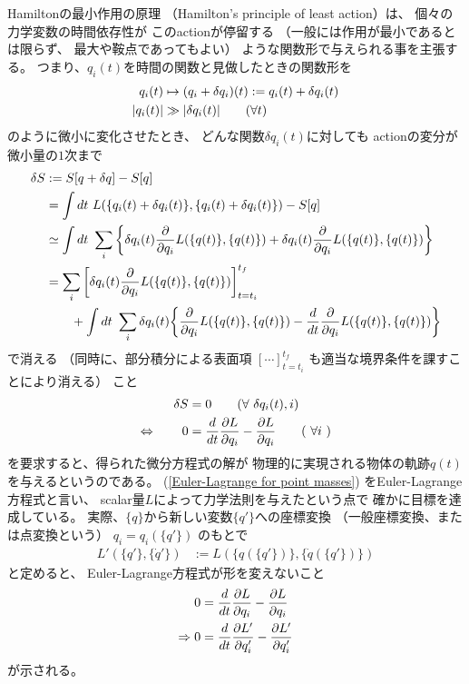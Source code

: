 Hamiltonの最小作用の原理
（Hamilton’s principle of least action）は、
個々の力学変数の時間依存性が
このactionが停留する
（一般には作用が最小であるとは限らず、
最大や鞍点であってもよい）
ような関数形で与えられる事を主張する。
つまり、$q_i(t)$を時間の関数と見做したときの関数形を
\begin{align}
  q_i(t) &\mapsto (q_i+\delta q_i)(t) := q_i(t) + \delta q_i(t)
  \\
  | q_i(t) | & \gg | \delta q_i(t) |
  \qquad (\forall t)
\notag
\end{align}
のように微小に変化させたとき、
どんな関数$\delta q_i(t)$に対しても
actionの変分が微小量の$1$次まで
\begin{align}
  \delta S &:=
  S[q + \delta q] - S[q]
\notag\\&=
  \int dt\ L(\{ q_i(t) + \delta q_i(t) \},
  \{ \dot{q}_i(t) + \delta \dot{q}_i(t) \} )
  - S[q]
\notag\\&\simeq
  \int dt\ \sum_i
  \bigg\{
    \delta q_i(t)
    \dfrac{\partial}{\partial q_i}
    L(\{ q(t) \},
    \{ \dot{q}(t) \} )
+
    \delta \dot{q}_i(t)
    \dfrac{\partial}{\partial \dot{q}_i}
    L(\{ q(t) \},
    \{ \dot{q}(t) \} )
  \bigg\}
\notag\\&=
  \sum_i
  \bigg[
    \delta q_i(t)
    \dfrac{\partial}{\partial \dot{q}_i}
    L(\{ q(t) \},
    \{ \dot{q}(t) \} )
  \bigg]_{t=t_i}^{t_f}
\notag\\&\qquad
  +
\int dt\ \sum_i
\delta q_i(t)
\bigg\{
  \dfrac{\partial}{\partial q_i}
  L(\{ q(t) \},
  \{ \dot{q}(t) \} )
-
  \dfrac{d}{dt}
  \dfrac{\partial}{\partial \dot{q}_i}
  L(\{ q(t) \},
  \{ \dot{q}(t) \} )
\bigg\}
\label{variation of action}
\end{align}
で消える
（同時に、部分積分による表面項
$[\cdots]_{t=t_i}^{t_f}$
も適当な境界条件を課すことにより消える）
こと
\begin{align}
  \delta S &= 0
  \qquad (\forall\ \delta q_i(t), i)
\notag\\\Leftrightarrow\qquad
  0 &=
  \dfrac{d}{dt}\dfrac{\partial L}{\partial \dot{q}_i }
  - \dfrac{\partial L}{\partial q_i }
  \qquad (\ \forall i\ )
\label{Euler-Lagrange for point masses}
\end{align}
を要求すると、得られた微分方程式の解が
物理的に実現される物体の軌跡${q(t)}$
を与えるというのである。
(\ref{Euler-Lagrange for point masses})
をEuler-Lagrange方程式と言い、
scalar量$L$によって力学法則を与えたという点で
確かに目標を達成している。
実際、$\{q\}$から新しい変数$\{ q'\}$への座標変換
（一般座標変換、または点変換という）
$q_i = q_i(\{q'\})$
のもとで
\begin{align}
  L'(\{q'\}, \{\dot{q}'\}) &:= L(\{q(\{q'\})\}, \{\dot{q}(\{q'\})\})
\end{align}
と定めると、
Euler-Lagrange方程式が形を変えないこと
\begin{align}
  0 &=
  \dfrac{d}{dt}\dfrac{\partial L}{\partial \dot{q}_i }
  - \dfrac{\partial L}{\partial q_i }
\notag\\\Rightarrow
0 &=
\dfrac{d}{dt}\dfrac{\partial L'}{\partial \dot{q}'_i }
- \dfrac{\partial L'}{\partial q_i' }
\label{point transformation}
\end{align}
が示される。

